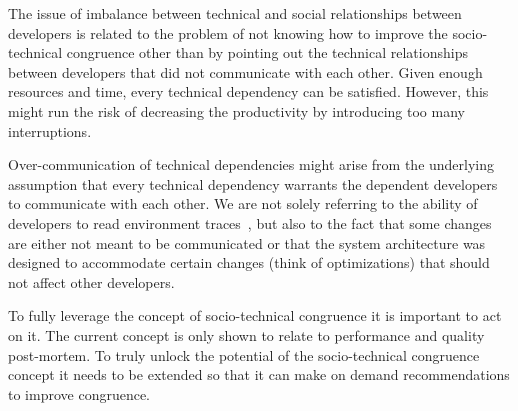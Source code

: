 The issue of imbalance between technical and social relationships between developers is related to the problem of not knowing how to improve the socio-technical congruence other than by pointing out the technical relationships between developers that did not communicate with each other.
Given enough resources and time, every technical dependency can be satisfied. 
However, this might run the risk of decreasing the productivity by introducing too many interruptions.

Over-communication of technical dependencies might arise from the underlying assumption that every technical dependency warrants the dependent developers to communicate with each other.
We are not solely referring to the ability of  developers to read environment traces~\cite{bolici:stc:2009}, but also to the fact that some changes are either not meant to be communicated or that the system architecture was designed to accommodate certain changes (think of optimizations) that should not affect other developers.

To fully leverage the concept of socio-technical congruence it is important to act on it.
The current concept is only shown to relate to performance and quality post-mortem.
To truly unlock the potential of the socio-technical congruence concept it needs to be extended so that it can make on demand recommendations to improve congruence.


